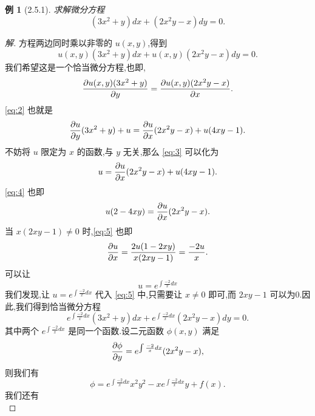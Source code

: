 \documentclass[a4paper, 12pt]{article} %
\newtheorem*{pdtheorem}{例}
\newenvironment{example}
{\bigskip\begin{mdframed}[backgroundcolor=gray!40,rightline=false,leftline=false,topline=false,bottomline=false]\begin{pdtheorem}}
    {\end{pdtheorem}\end{mdframed}\bigskip}
\begin{document}
\begin{CJK}{UTF8}{gkai}
  \begin{example}[2.5.1]
求解微分方程
\begin{equation}
  \label{eq:1}
  (3x^2+y)dx+(2x^2y-x)dy=0.
\end{equation}
  \end{example}
  \begin{proof}[解]
方程两边同时乘以非零的 $u(x,y)$,得到
$$
u(x,y)(3x^2+y)dx+u(x,y)(2x^2y-x)dy=0.
$$
我们希望这是一个恰当微分方程,也即,
\begin{equation}
  \label{eq:2}
  \frac{\partial u(x,y)(3x^2+y)}{\partial y}=\frac{\partial u(x,y)(2x^2y-x)}{\partial x}.
\end{equation}
\eqref{eq:2} 也就是
\begin{equation}
  \label{eq:3}
  \frac{\partial u}{\partial y}(3x^2+y)+u=\frac{\partial u}{\partial x}(2x^2y-x)+u(4xy-1).
\end{equation}
不妨将 $u$ 限定为 $x$ 的函数,与 $y$ 无关,那么 \eqref{eq:3} 可以化为
\begin{equation}
  \label{eq:4}
  u=\frac{\partial u}{\partial x}(2x^2y-x)+u(4xy-1).
\end{equation}
\eqref{eq:4} 也即
\begin{equation}
  \label{eq:5}
  u(2-4xy)=\frac{\partial u}{\partial x}(2x^2y-x).
\end{equation}
当 $x(2xy-1)\neq 0$ 时,\eqref{eq:5} 也即
\begin{equation}
  \label{eq:6}
  \frac{\partial u}{\partial x}=\frac{2u(1-2xy)}{x(2xy-1)}=\frac{-2u}{x}.
\end{equation}
可以让
$$
u=e^{\int \frac{-2}{x}dx}
$$
我们发现,让 $u=e^{\int \frac{-2}{x}dx}$ 代入 \eqref{eq:5} 中,只需要让
$x\neq 0$ 即可,而 $2xy-1$ 可以为0.因此,我们得到恰当微分方程
\begin{equation}
  \label{eq:7}
  e^{\int \frac{-2}{x}dx}(3x^2+y)dx+e^{\int \frac{-2}{x}dx}(2x^2y-x)dy=0.
\end{equation}
其中两个 $e^{\int \frac{-2}{x}dx}$ 是同一个函数.设二元函数 $\phi(x,y)$ 满足
\begin{equation}
  \label{eq:8}
  \frac{\partial\phi}{\partial y}=e^{\int \frac{-2}{x}dx}(2x^2y-x),
\end{equation}
则我们有
\begin{equation}
  \label{eq:9}
  \phi=e^{\int \frac{-2}{x}dx}x^2y^2-xe^{\int \frac{-2}{x}dx}y+f(x).
\end{equation}
我们还有
\begin{equation}

\end{equation}
\end{proof}
\end{CJK}
\end{document}
